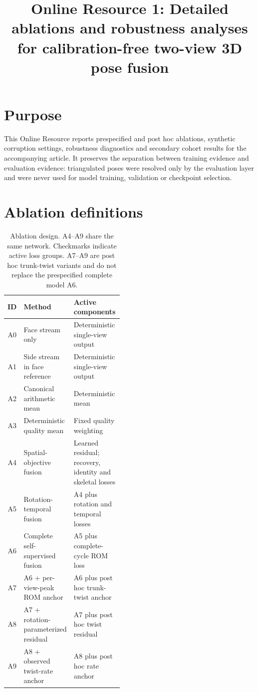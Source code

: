 \documentclass[pdflatex,sn-mathphys-num]{sn-jnl}
\begin{document}
\title{Online Resource 1: Detailed ablations and robustness analyses for
calibration-free two-view 3D pose fusion}

\author*[1]{ }

\maketitle

\section{Purpose}

This Online Resource reports prespecified and post hoc ablations, synthetic
corruption settings, robustness diagnostics and secondary cohort results for
the accompanying article. It preserves the separation between training
evidence and evaluation evidence: triangulated poses were resolved only by the
evaluation layer and were never used for model training, validation or
checkpoint selection.

\section{Ablation definitions}

\begin{table}[h]
\caption{Ablation design. A4--A9 share the same network. Checkmarks indicate
active loss groups. A7--A9 are post hoc trunk-twist variants and do not replace
the prespecified complete model A6.}
\label{tab:ablation}
\centering
\small
\setlength{\tabcolsep}{4pt}
\begin{tabular}{clp{0.46\linewidth}}
\toprule
ID & Method & Active components\\
\midrule
A0 & Face stream only & Deterministic single-view output\\
A1 & Side stream in face reference & Deterministic single-view output\\
A2 & Canonical arithmetic mean & Deterministic mean\\
A3 & Deterministic quality mean & Fixed quality weighting\\
A4 & Spatial-objective fusion & Learned residual; recovery, identity and skeletal losses\\
A5 & Rotation-temporal fusion & A4 plus rotation and temporal losses\\
A6 & Complete self-supervised fusion & A5 plus complete-cycle ROM loss\\
A7 & A6 + per-view-peak ROM anchor & A6 plus post hoc trunk-twist anchor\\
A8 & A7 + rotation-parameterized residual & A7 plus post hoc twist residual\\
A9 & A8 + observed twist-rate anchor & A8 plus post hoc rate anchor\\
\bottomrule
\end{tabular}
\end{table}
\end{document}
